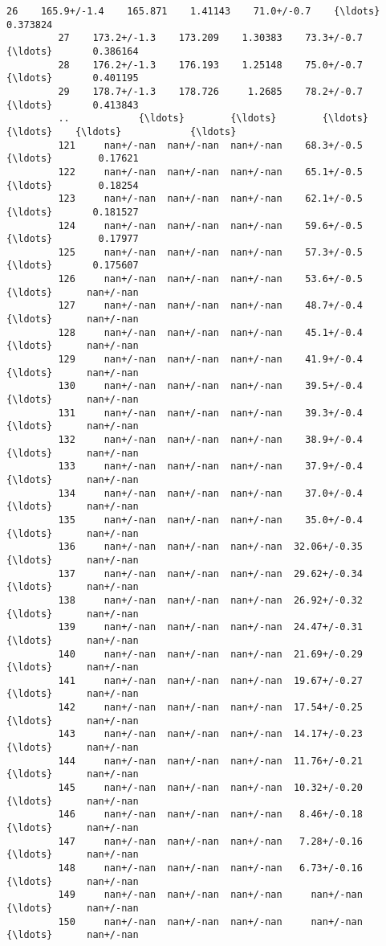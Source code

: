 \documentclass[11pt]{article}
\begin{document}
\begin{Verbatim}[commandchars=\\\{\}]
         26    165.9+/-1.4    165.871    1.41143    71.0+/-0.7    {\ldots}       0.373824   
         27    173.2+/-1.3    173.209    1.30383    73.3+/-0.7    {\ldots}       0.386164   
         28    176.2+/-1.3    176.193    1.25148    75.0+/-0.7    {\ldots}       0.401195   
         29    178.7+/-1.3    178.726     1.2685    78.2+/-0.7    {\ldots}       0.413843   
         ..            {\ldots}        {\ldots}        {\ldots}           {\ldots}    {\ldots}            {\ldots}   
         121     nan+/-nan  nan+/-nan  nan+/-nan    68.3+/-0.5    {\ldots}        0.17621   
         122     nan+/-nan  nan+/-nan  nan+/-nan    65.1+/-0.5    {\ldots}        0.18254   
         123     nan+/-nan  nan+/-nan  nan+/-nan    62.1+/-0.5    {\ldots}       0.181527   
         124     nan+/-nan  nan+/-nan  nan+/-nan    59.6+/-0.5    {\ldots}        0.17977   
         125     nan+/-nan  nan+/-nan  nan+/-nan    57.3+/-0.5    {\ldots}       0.175607   
         126     nan+/-nan  nan+/-nan  nan+/-nan    53.6+/-0.5    {\ldots}      nan+/-nan   
         127     nan+/-nan  nan+/-nan  nan+/-nan    48.7+/-0.4    {\ldots}      nan+/-nan   
         128     nan+/-nan  nan+/-nan  nan+/-nan    45.1+/-0.4    {\ldots}      nan+/-nan   
         129     nan+/-nan  nan+/-nan  nan+/-nan    41.9+/-0.4    {\ldots}      nan+/-nan   
         130     nan+/-nan  nan+/-nan  nan+/-nan    39.5+/-0.4    {\ldots}      nan+/-nan   
         131     nan+/-nan  nan+/-nan  nan+/-nan    39.3+/-0.4    {\ldots}      nan+/-nan   
         132     nan+/-nan  nan+/-nan  nan+/-nan    38.9+/-0.4    {\ldots}      nan+/-nan   
         133     nan+/-nan  nan+/-nan  nan+/-nan    37.9+/-0.4    {\ldots}      nan+/-nan   
         134     nan+/-nan  nan+/-nan  nan+/-nan    37.0+/-0.4    {\ldots}      nan+/-nan   
         135     nan+/-nan  nan+/-nan  nan+/-nan    35.0+/-0.4    {\ldots}      nan+/-nan   
         136     nan+/-nan  nan+/-nan  nan+/-nan  32.06+/-0.35    {\ldots}      nan+/-nan   
         137     nan+/-nan  nan+/-nan  nan+/-nan  29.62+/-0.34    {\ldots}      nan+/-nan   
         138     nan+/-nan  nan+/-nan  nan+/-nan  26.92+/-0.32    {\ldots}      nan+/-nan   
         139     nan+/-nan  nan+/-nan  nan+/-nan  24.47+/-0.31    {\ldots}      nan+/-nan   
         140     nan+/-nan  nan+/-nan  nan+/-nan  21.69+/-0.29    {\ldots}      nan+/-nan   
         141     nan+/-nan  nan+/-nan  nan+/-nan  19.67+/-0.27    {\ldots}      nan+/-nan   
         142     nan+/-nan  nan+/-nan  nan+/-nan  17.54+/-0.25    {\ldots}      nan+/-nan   
         143     nan+/-nan  nan+/-nan  nan+/-nan  14.17+/-0.23    {\ldots}      nan+/-nan   
         144     nan+/-nan  nan+/-nan  nan+/-nan  11.76+/-0.21    {\ldots}      nan+/-nan   
         145     nan+/-nan  nan+/-nan  nan+/-nan  10.32+/-0.20    {\ldots}      nan+/-nan   
         146     nan+/-nan  nan+/-nan  nan+/-nan   8.46+/-0.18    {\ldots}      nan+/-nan   
         147     nan+/-nan  nan+/-nan  nan+/-nan   7.28+/-0.16    {\ldots}      nan+/-nan   
         148     nan+/-nan  nan+/-nan  nan+/-nan   6.73+/-0.16    {\ldots}      nan+/-nan   
         149     nan+/-nan  nan+/-nan  nan+/-nan     nan+/-nan    {\ldots}      nan+/-nan   
         150     nan+/-nan  nan+/-nan  nan+/-nan     nan+/-nan    {\ldots}      nan+/-nan   
         

\end{Verbatim}
\end{document}
